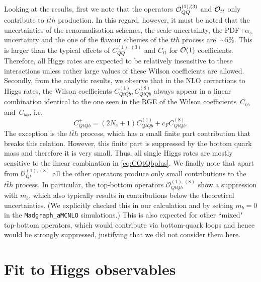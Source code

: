 Looking at the results, first we note that the operators ${\cal O}_{QQ}^{(1),(3)} $ and ${\cal O}_{tt}$ only contribute to $t\bar t h$ production. 
In this regard, however, it must be noted that the uncertainties of the renormalisation schemes, the scale uncertainty, the PDF+$\alpha_s$ uncertainty and the one of the flavour schemes of the $t\bar t h$ process are~$ \sim 5\%$. This is larger than the typical effects of $C_{QQ}^{(1),(3)} $ and $C_{tt}$ for ${\cal O}(1)$ coefficients. Therefore, all Higgs rates are expected to be relatively insensitive to these interactions 
unless rather large values of these Wilson coefficients are allowed.  
Secondly, from the analytic results, we observe that in the NLO corrections to Higgs rates, the Wilson coefficients $C_{QtQb}^{(1)} ,  C_{QtQb}^{(8)}$ always appear in a linear combination identical to the one seen in the RGE of the Wilson coefficients~$C_{t\phi}$ and~$C_{b\phi}$, i.e. 
%
\begin{equation}
	C_{QtQb}^+= (2N_c+1 )C_{QtQb}^{(1)} + c_F   C_{QtQb}^{(8)}.
	\label{eq:CQtQbplus}
\end{equation}
%
The exception is the $t\bar t h$ process, which has a small finite part contribution that breaks this relation. However, this finite part is suppressed by the bottom quark mass and therefore it is very small. Thus, all single Higgs rates are mostly sensitive to the linear combination in \eqref{eq:CQtQbplus}.
We finally note that apart from $\mathcal{O}_{Qt}^{(1),(8)}$ all the other operators produce only small contributions to the $t\bar{t}h$ process. In particular, the top-bottom operators $\mathcal{O}_{QtQb}^{(1),(8)}$ show a suppression with $m_b$, which also typically results in contributions below the theoretical uncertainties. (We explicitly checked this in our calculation and by setting $m_b=0$ in the \texttt{Madgraph\_aMCNLO} simulations.)  This is also expected for other ``mixed" top-bottom operators,
which would contribute via bottom-quark loops and hence would be strongly suppressed, justifying that we did not consider them here. 

\section{Fit to Higgs observables \label{sec:fit}}

